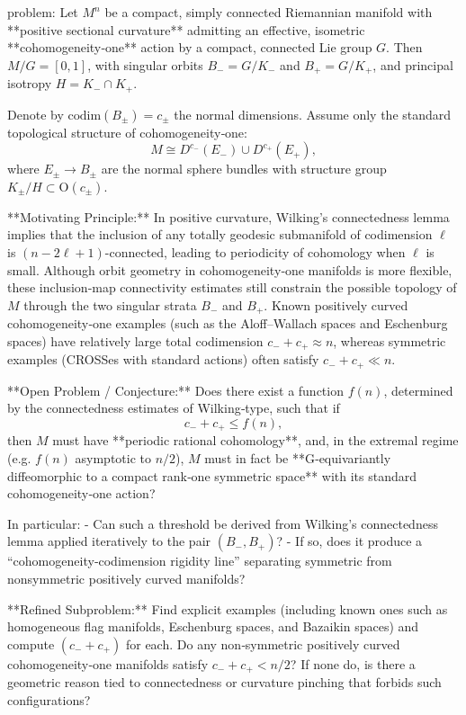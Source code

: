 problem:  
Let \( M^n \) be a compact, simply connected Riemannian manifold with **positive sectional curvature** admitting an effective, isometric **cohomogeneity‑one** action by a compact, connected Lie group \( G \).  
Then \( M / G = [0,1] \), with singular orbits \( B_- = G / K_- \) and \( B_+ = G / K_+ \), and principal isotropy \( H = K_- \cap K_+ \).  

Denote by \(\mathrm{codim}(B_\pm) = c_\pm\) the normal dimensions. Assume only the standard topological structure of cohomogeneity‑one:
\[
M \cong D^{c_-}(E_-)\cup D^{c_+}(E_+),
\]
where \(E_\pm \to B_\pm\) are the normal sphere bundles with structure group \(K_\pm/H \subset \mathrm{O}(c_\pm)\).

**Motivating Principle:**  
In positive curvature, Wilking’s connectedness lemma implies that the inclusion of any totally geodesic submanifold of codimension \(\ell\) is \((n-2\ell+1)\)-connected, leading to periodicity of cohomology when \(\ell\) is small.  
Although orbit geometry in cohomogeneity‑one manifolds is more flexible, these inclusion‑map connectivity estimates still constrain the possible topology of \(M\) through the two singular strata \(B_-\) and \(B_+\).  
Known positively curved cohomogeneity‑one examples (such as the Aloff–Wallach spaces and Eschenburg spaces) have relatively large total codimension \(c_- + c_+ \approx n\), whereas symmetric examples (CROSSes with standard actions) often satisfy \(c_- + c_+ \ll n\).

**Open Problem / Conjecture:**  
Does there exist a function \( f(n) \), determined by the connectedness estimates of Wilking‑type, such that if
\[
c_- + c_+ \le f(n),
\]
then \( M \) must have **periodic rational cohomology**, and, in the extremal regime (e.g. \(f(n)\) asymptotic to \(n/2\)), \(M\) must in fact be **G‑equivariantly diffeomorphic to a compact rank‑one symmetric space** with its standard cohomogeneity‑one action?  

In particular:
- Can such a threshold be derived from Wilking’s connectedness lemma applied iteratively to the pair \((B_-, B_+)\)?  
- If so, does it produce a “cohomogeneity‑codimension rigidity line” separating symmetric from nonsymmetric positively curved manifolds?  

**Refined Subproblem:**  
Find explicit examples (including known ones such as homogeneous flag manifolds, Eschenburg spaces, and Bazaikin spaces) and compute \((c_- + c_+)\) for each.  
Do any non‑symmetric positively curved cohomogeneity‑one manifolds satisfy \(c_- + c_+ < n/2\)?  
If none do, is there a geometric reason tied to connectedness or curvature pinching that forbids such configurations?

